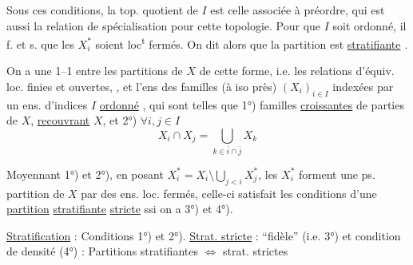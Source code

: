 Sous ces conditions, la top. quotient de $I$ est celle
associée à  préordre, qui est aussi
la relation de spécialisation pour cette topologie.
Pour que $I$ soit ordonné, il f. et s. que les
$X_i^*$ soient loc\textsuperscript{t} fermés. On dit alors que la partition est
\uline{stratifiante} .

On a une  1--1 entre les partitions
 de $X$ de cette forme, i.e. les relations d'équiv. loc.
finies et ouvertes, , et l'ens des familles (à iso près)
$(X_i)_{i\in I}$ indexées par un ens. d'indices $I$ \uline{ordonné}
,
qui sont telles que 1°) familles \uline{croissantes} de parties
  de $X$,  \uline{recouvrant} $X$, et 2°) $\forall i,j\in I$
\[
X_i\cap X_j=\bigcup_{k\in\overline i\cap\overline j}X_k
\]


Moyennant 1°) et 2°), en posant $X_i^*=X_i\setminus\bigcup_{j<i}X_j^*$,
les $X_i^*$ forment une ps. partition  de $X$ par des
ens. loc. fermés, celle-ci satisfait les conditions
d'une \uline{partition} \uline{stratifiante} \uline{stricte}  ssi
on a 3°) et 4°).

\uline{Stratification} : Conditions 1°) et 2°). \uline{Strat. stricte} : ``fidèle'' (i.e.
3°) et condition de densité (4°) : Partitions stratifiantes $\Longleftrightarrow$ strat. strictes
